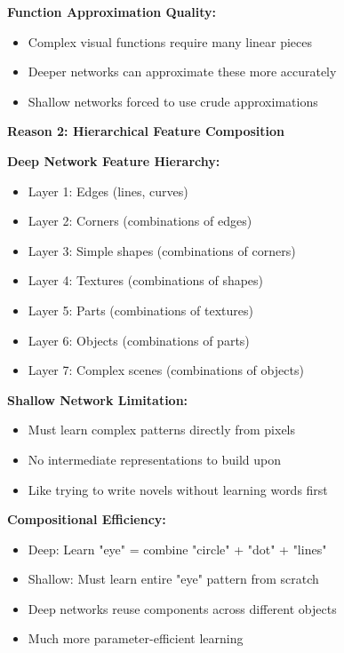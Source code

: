 \documentclass[12pt]{article}
\newcommand{\explanation}[1]{{\color{explanationcolor}#1}}
\begin{document}
\begin{enumerate}[(a)]
{{    \textbf{Function Approximation Quality:}
    \begin{itemize}
        \item Complex visual functions require many linear pieces
        \item Deeper networks can approximate these more accurately
        \item Shallow networks forced to use crude approximations
    \end{itemize}
    }
    
    \textbf{Reason 2: Hierarchical Feature Composition}
    
    \explanation{
    \textbf{Deep Network Feature Hierarchy:}
    \begin{itemize}
        \item Layer 1: Edges (lines, curves)
        \item Layer 2: Corners (combinations of edges)
        \item Layer 3: Simple shapes (combinations of corners)
        \item Layer 4: Textures (combinations of shapes)
        \item Layer 5: Parts (combinations of textures)
        \item Layer 6: Objects (combinations of parts)
        \item Layer 7: Complex scenes (combinations of objects)
    \end{itemize}
    
    \textbf{Shallow Network Limitation:}
    \begin{itemize}
        \item Must learn complex patterns directly from pixels
        \item No intermediate representations to build upon
        \item Like trying to write novels without learning words first
    \end{itemize}
    
    \textbf{Compositional Efficiency:}
    \begin{itemize}
        \item Deep: Learn "eye" = combine "circle" + "dot" + "lines"
        \item Shallow: Must learn entire "eye" pattern from scratch
        \item Deep networks reuse components across different objects
        \item Much more parameter-efficient learning
    \end{itemize}
    }
    
}
\end{enumerate}
\end{document}
